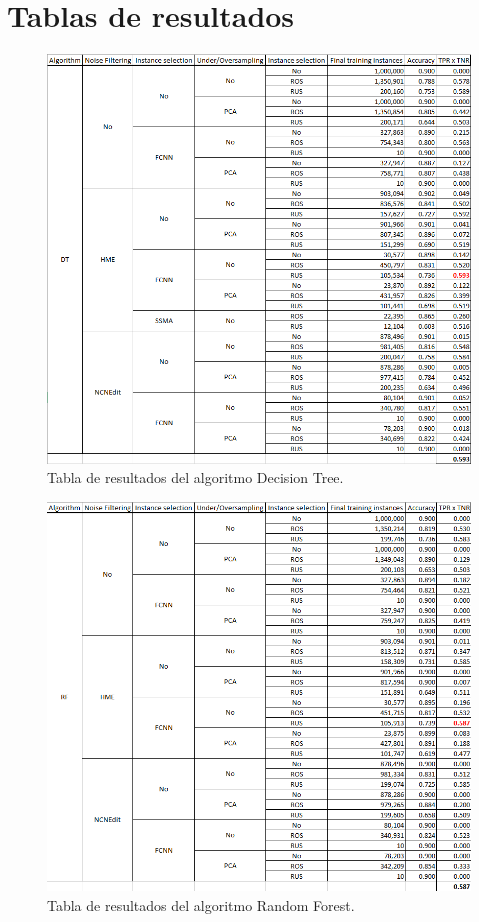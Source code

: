 \section{Tablas de resultados}

\begin{figure}[H]
    \centerfloat
    \includegraphics[width=1.2\textwidth]{img/dt.png}
    \caption{Tabla de resultados del algoritmo Decision Tree.}
\end{figure}

\begin{figure}[ht]
    \centerfloat
    \includegraphics[width=1.2\textwidth]{img/rf.png}
    \caption{Tabla de resultados del algoritmo Random Forest.}
\end{figure}

